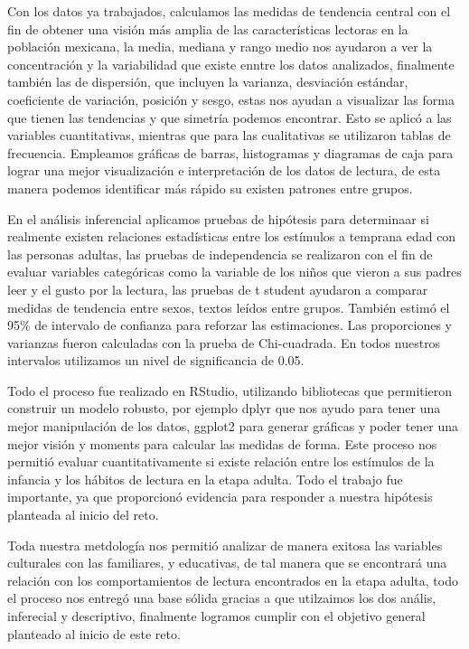 \documentclass[aps,reprint]{revtex4-2}
\begin{document}
Con los datos ya trabajados, calculamos las medidas de tendencia central con el fin de obtener una visión más amplia de las características lectoras en la población mexicana, la media, mediana y rango medio nos ayudaron a ver la concentración y la variabilidad que existe enntre los datos analizados, finalmente también las de dispersión, que incluyen la varianza, desviación estándar, coeficiente de variación, posición y sesgo, estas nos ayudan a visualizar las forma que tienen las tendencias y que simetría podemos encontrar. Esto se aplicó a las variables cuantitativas, mientras que para las cualitativas se utilizaron tablas de frecuencia. Empleamos gráficas de barras, histogramas y diagramas de caja para lograr una mejor visualización e interpretación de los datos de lectura, de esta manera podemos identificar más rápido su existen patrones entre grupos.

En el análisis inferencial aplicamos pruebas de hipótesis para determinaar si realmente existen relaciones estadísticas entre los estímulos a temprana edad con las personas adultas, las pruebas de independencia se realizaron con el fin de evaluar variables categóricas como la variable de los niños que vieron a sus padres leer y el gusto por la lectura, las pruebas de t student ayudaron a comparar medidas de tendencia entre sexos, textos leídos entre grupos. También estimó el 95\% de intervalo de confianza para reforzar las estimaciones. Las proporciones y varianzas fueron calculadas con la prueba de Chi-cuadrada. En todos nuestros intervalos utilizamos un nivel de significancia de 0.05.

Todo el proceso fue realizado en RStudio, utilizando bibliotecas que permitieron construir un modelo robusto, por ejemplo dplyr que nos ayudo para tener una mejor manipulación de los datos, ggplot2 para generar gráficas y poder tener una mejor visión y moments para calcular las medidas de forma. Este proceso nos permitió evaluar cuantitativamente si existe relación entre los estímulos de la infancia y los hábitos de lectura en la etapa adulta. Todo el trabajo fue importante, ya que proporcionó evidencia para responder a nuestra hipótesis planteada al inicio del reto.

Toda nuestra metdología nos permitió analizar de manera exitosa las variables culturales con las familiares, y educativas, de tal manera que se encontrará una relación con los comportamientos de lectura encontrados en la etapa adulta, todo el proceso nos entregó una base sólida gracias a que utilzaimos los dos anális, inferecial y descriptivo, finalmente logramos cumplir con el objetivo general planteado al inicio de este reto.
\end{document}
